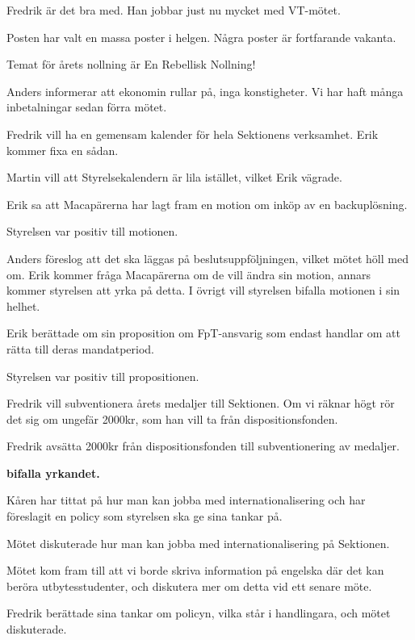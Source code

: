 \documentclass[10pt]{article}
\begin{document}
\begin{paragrafer}
\begin{paragrafer}
Fredrik är det bra med. Han jobbar just nu mycket med VT-mötet.

Posten har valt en massa poster i helgen. Några poster är fortfarande vakanta.

Temat för årets nollning är En Rebellisk Nollning!

Anders informerar att ekonomin rullar på, inga konstigheter. Vi har haft många inbetalningar sedan förra mötet.

\end{paragrafer}

Fredrik vill ha en gemensam kalender för hela Sektionens verksamhet. Erik kommer fixa en sådan.

Martin vill att Styrelsekalendern är lila istället, vilket Erik vägrade.

Erik sa att Macapärerna har lagt fram en motion om inköp av en backuplösning.

Styrelsen var positiv till motionen.

Anders föreslog att det ska läggas på beslutsuppföljningen, vilket mötet höll med om. Erik kommer fråga Macapärerna om de vill ändra sin motion, annars kommer styrelsen att yrka på detta. I övrigt vill styrelsen bifalla motionen i sin helhet.

Erik berättade om sin proposition om FpT-ansvarig som endast handlar om att rätta till deras mandatperiod.

Styrelsen var positiv till propositionen.

Fredrik vill subventionera årets medaljer till Sektionen. Om vi räknar högt rör det sig om ungefär 2000kr, som han vill ta från dispositionsfonden.

Fredrik \ypa avsätta 2000kr från dispositionsfonden till subventionering av medaljer.

\textbf{\Mba bifalla yrkandet.}

Kåren har tittat på hur man kan jobba med internationalisering och har föreslagit en policy som styrelsen ska ge sina tankar på.

Mötet diskuterade hur man kan jobba med internationalisering på Sektionen.

Mötet kom fram till att vi borde skriva information på engelska där det kan beröra utbytesstudenter, och diskutera mer om detta vid ett senare möte.

Fredrik berättade sina tankar om policyn, vilka står i handlingara, och
mötet diskuterade.


\end{paragrafer}
\end{document}
